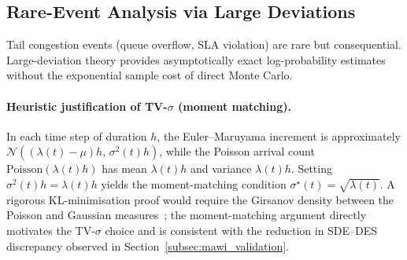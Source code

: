 \documentclass[pdflatex,sn-mathphys-num]{sn-jnl}
\theoremstyle{thmstyleone}%
\theoremstyle{thmstyletwo}%
\theoremstyle{thmstylethree}%
\begin{document}
\subsection{Rare-Event Analysis via Large Deviations}
\label{subsec:rare_event}

Tail congestion events (queue overflow, SLA violation) are rare but consequential.
Large-deviation theory provides asymptotically exact log-probability estimates without
the exponential sample cost of direct Monte Carlo.

\paragraph{Heuristic justification of TV-$\sigma$ (moment matching).}
In each time step of duration $h$, the Euler--Maruyama increment is approximately
$\mathcal{N}((\lambda(t)-\mu)h,\,\sigma^2(t)h)$, while the Poisson arrival count
$\mathrm{Poisson}(\lambda(t)h)$ has mean $\lambda(t)h$ and variance $\lambda(t)h$.
Setting $\sigma^2(t)h = \lambda(t)h$ yields the moment-matching condition
$\sigma^\star(t)=\sqrt{\lambda(t)}$. A rigorous KL-minimisation proof would require the
Girsanov density between the Poisson and Gaussian measures~\cite{kabanov1978,liptser2001statistics};
the moment-matching argument directly motivates the TV-$\sigma$ choice and is consistent with
the reduction in SDE--DES discrepancy observed in
Section~\ref{subsec:mawi_validation}.
\end{document}
